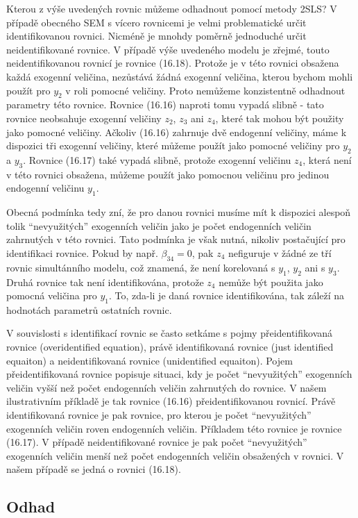 Kterou z výše uvedených rovnic můžeme odhadnout pomocí metody 2SLS? V případě obecného SEM s vícero rovnicemi je velmi problematické určit identifikovanou rovnici. Nicméně je mnohdy poměrně jednoduché určit neidentifikované rovnice. V případě výše uvedeného modelu je zřejmé, touto neidentifikovanou rovnicí je rovnice (16.18). Protože je v této rovnici obsažena každá exogenní veličina, nezůstává žádná exogenní veličina, kterou bychom mohli použít pro $y_2$ v roli pomocné veličiny. Proto nemůžeme konzistentně odhadnout parametry této rovnice. Rovnice (16.16) naproti tomu vypadá slibně - tato rovnice neobsahuje exogenní veličiny $z_2$, $z_3$ ani $z_4$, které tak mohou být použity jako pomocné veličiny. Ačkoliv (16.16) zahrnuje dvě endogenní veličiny, máme k dispozici tři exogenní veličiny, které můžeme použít jako pomocné veličiny pro $y_2$ a $y_3$. Rovnice (16.17) také vypadá slibně, protože exogenní veličinu $z_4$, která není v této rovnici obsažena, můžeme použít jako pomocnou veličinu pro jedinou endogenní veličinu $y_1$.

Obecná podmínka tedy zní, že pro danou rovnici musíme mít k dispozici alespoň tolik ``nevyužitých'' exogenních veličin jako je počet endogenních veličin zahrnutých v této rovnici. Tato podmínka je však nutná, nikoliv postačující pro identifikaci rovnice. Pokud by např. $\beta_{34} = 0$, pak $z_4$ nefiguruje v žádné ze tří rovnic simultánního modelu, což znamená, že není korelovaná s $y_1$, $y_2$ ani s $y_3$. Druhá rovnice tak není identifikována, protože $z_4$ nemůže být použita jako pomocná veličina pro $y_1$. To, zda-li je daná rovnice identifikována, tak záleží na hodnotách parametrů ostatních rovnic.

V souvislosti s identifikací rovnic se často setkáme s pojmy přeidentifikovaná rovnice (overidentified equation), právě identifikovaná rovnice (just identified equaiton) a neidentifikovaná rovnice (unidentified equaiton). Pojem přeidentifikovaná rovnice popisuje situaci, kdy je počet ``nevyužitých'' exogenních veličin vyšší než počet endogenních veličin zahrnutých do rovnice. V našem ilustrativním příkladě je tak rovnice (16.16) přeidentifikovanou rovnicí. Právě identifikovaná rovnice je pak rovnice, pro kterou je počet ``nevyužitých'' exogenních veličin roven endogenních veličin. Příkladem této rovnice je rovnice (16.17). V případě neidentifikované rovnice je pak počet ``nevyužitých'' exogenních veličin menší než počet endogenních veličin obsažených v rovnici. V našem případě se jedná o rovnici (16.18).

\subsection{Odhad}

